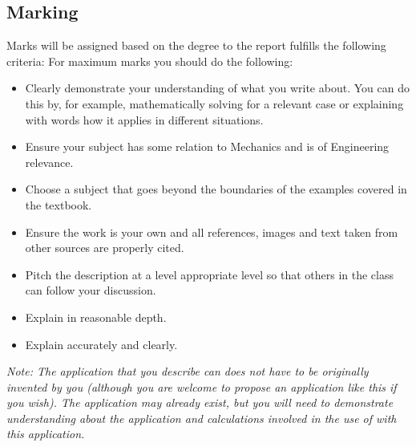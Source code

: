 \subsection{Marking}
Marks will be assigned based on the degree to the report fulfills the following criteria:
For maximum marks you should do the following:
\begin{itemize}
    \item Clearly demonstrate your understanding of what you write about. You can do this by, for example, mathematically solving for a relevant case or explaining with words how it applies in different situations.
    \item Ensure your subject has some relation to Mechanics and is of Engineering relevance.
    \item Choose a subject that goes beyond the boundaries of the examples covered in the textbook.
    \item Ensure the work is your own and all references, images and text taken from other sources are properly cited.
    \item Pitch the description at a level appropriate level so that others in the class can follow your discussion.
    \item Explain in reasonable depth.
    \item Explain accurately and clearly.
\end{itemize}

\emph{Note: The application that you describe can does not have to be originally invented by you (although you are welcome to propose an application like this if you wish). The application may already exist, but you will need to demonstrate understanding about the application and calculations involved in the use of \course with this application.}
